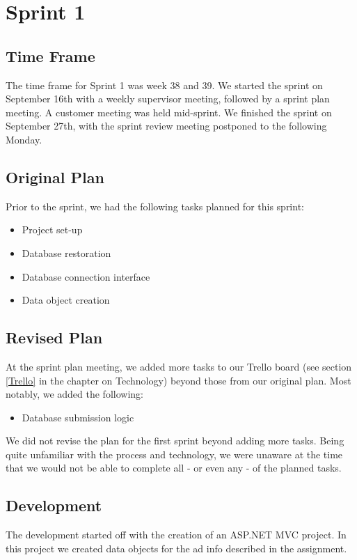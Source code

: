 \section{Sprint 1}

\subsection{Time Frame}
The time frame for Sprint 1 was week 38 and 39. We started the sprint on September 16th with a weekly supervisor meeting, followed by a sprint plan meeting. A customer meeting was held mid-sprint. We finished the sprint on September 27th, with the sprint review meeting postponed to the following Monday.

\subsection{Original Plan}
Prior to the sprint, we had the following tasks planned for this sprint:
\begin{itemize}
	\item Project set-up
	\item Database restoration
	\item Database connection interface
	\item Data object creation
\end{itemize}

\subsection{Revised Plan}
At the sprint plan meeting, we added more tasks to our Trello board (see section \ref{Trello} in the chapter on Technology) beyond those from our original plan. Most notably, we added the following:
\begin{itemize}
	\item Database submission logic
\end{itemize}

We did not revise the plan for the first sprint beyond adding more tasks. Being quite unfamiliar with the process and technology, we were unaware at the time that we would not be able to complete all - or even any - of the planned tasks.

\subsection{Development}
The development started off with the creation of an ASP.NET MVC project. In this project we created data objects for the ad info described in the assignment.

